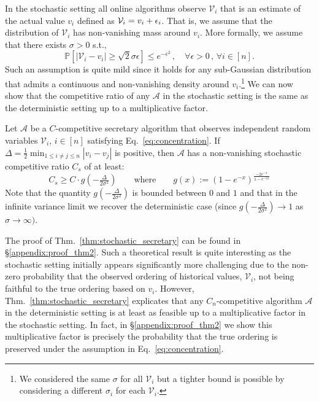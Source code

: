In the stochastic setting all online algorithms observe $\mathcal{V}_i$ that is an estimate of the actual value $v_i$ defined as $\mathcal{V}_i = v_i + {\epsilon}_i$. That is, we assume that the distribution of $\mathcal{V}_{i}$ has non-vanishing mass around $v_i$. More formally, we assume that there exists $\sigma>0$ s.t., 
    \begin{equation}
        \mathbb{P}[|\mathcal{V}_{i}-v_i| \geq \sqrt{2}\sigma \epsilon] \leq e^{-\epsilon^2} \,,\quad \forall \epsilon >0\,,\,\forall i \in [n].
        \label{eq:concentration}
    \end{equation}
Such an assumption is quite mild since it holds for any sub-Gaussian distribution that admits a continuous and non-vanishing density around $v_i$.\footnote{We considered the same $\sigma$ for all $\mathcal{V}_{i}$ but a tighter bound is possible by considering a different $\sigma_i$ for each $\mathcal{V}_{i}$.}
We can now show that the competitive ratio of any $\mathcal{A}$ in the stochastic setting is the same as the deterministic setting up to a multiplicative factor.
\begin{theorem}\label{thm:stochastic_secretary}
Let $\mathcal{A}$ be a $C$-competitive secretary algorithm that observes independent random variables $\mathcal{V}_{i},\, i\in [n]$ satisfying Eq.~\ref{eq:concentration}. If $\Delta = \tfrac{1}{2}\min_{1\leq i \neq j \leq  n } |v_i - v_j|$ is positive, then $\mathcal{A}$ has a non-vanishing stochastic competitive ratio $C_{s}$ of at least:  
\begin{equation}
   C_{s} \geq  C \cdot g( -\tfrac{\Delta}{2\sigma^2})  \qquad  \text{where} \qquad g(x) := \left( 1-e^{- x} \right)^{\frac{-2 e^{-x}}{1 -  e^{-2x}}}
\end{equation}
Note that the quantity $g\left( -\tfrac{\Delta}{2\sigma^2}\right)$ is bounded between $0$ and $1$ and that in the infinite variance limit we recover the deterministic case (since $g( -\tfrac{\Delta}{2\sigma^2}) {\to} 1$ as $\sigma \to \infty)$.
\end{theorem}

The proof of Thm.~\ref{thm:stochastic_secretary} can be found in \S\ref{appendix:proof_thm2}. Such a theoretical result is quite interesting as the stochastic setting initially appears significantly more challenging due to the non-zero probability that the observed ordering of historical values, $\mathcal{V}_i$, not being faithful to the true ordering based on $v_i$. However, Thm.~\ref{thm:stochastic_secretary} explicates that any $C_n$-competitive algorithm $\mathcal{A}$ in the deterministic setting is at least as feasible up to a multiplicative factor in the stochastic setting. In fact, in \S\ref{appendix:proof_thm2} we show this multiplicative factor is precisely the probability that the true ordering  is preserved under the assumption in Eq.~\ref{eq:concentration}.



